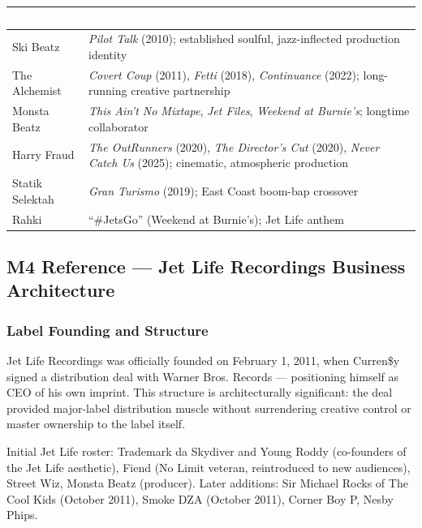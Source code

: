\documentclass[11pt,letterpaper]{article}
\newcommand{\tableheader}[1]{\textbf{\sffamily\textcolor{white}{#1}}}
\begin{document}
\begin{center}
\begin{tabularx}{\textwidth}{L{3.5cm}X}
\toprule
{}
\tableheader{Producer} & \tableheader{Key Projects / Role} \\
\midrule
Ski Beatz & \textit{Pilot Talk} (2010); established soulful, jazz-inflected production identity \\
The Alchemist & \textit{Covert Coup} (2011), \textit{Fetti} (2018), \textit{Continuance} (2022); long-running creative partnership \\
Monsta Beatz & \textit{This Ain't No Mixtape}, \textit{Jet Files}, \textit{Weekend at Burnie's}; longtime collaborator \\
Harry Fraud & \textit{The OutRunners} (2020), \textit{The Director's Cut} (2020), \textit{Never Catch Us} (2025); cinematic, atmospheric production \\
Statik Selektah & \textit{Gran Turismo} (2019); East Coast boom-bap crossover \\
Rahki & ``\#JetsGo'' (Weekend at Burnie's); Jet Life anthem \\
\bottomrule
\end{tabularx}
\end{center}

\subsection{M4 Reference — Jet Life Recordings Business Architecture}

\subsubsection{Label Founding and Structure}

Jet Life Recordings was officially founded on February 1, 2011, when Curren\$y signed a distribution deal with Warner Bros. Records — positioning himself as CEO of his own imprint. This structure is architecturally significant: the deal provided major-label distribution muscle without surrendering creative control or master ownership to the label itself.

Initial Jet Life roster: Trademark da Skydiver and Young Roddy (co-founders of the Jet Life aesthetic), Fiend (No Limit veteran, reintroduced to new audiences), Street Wiz, Monsta Beatz (producer). Later additions: Sir Michael Rocks of The Cool Kids (October 2011), Smoke DZA (October 2011), Corner Boy P, Nesby Phips.
\end{document}
